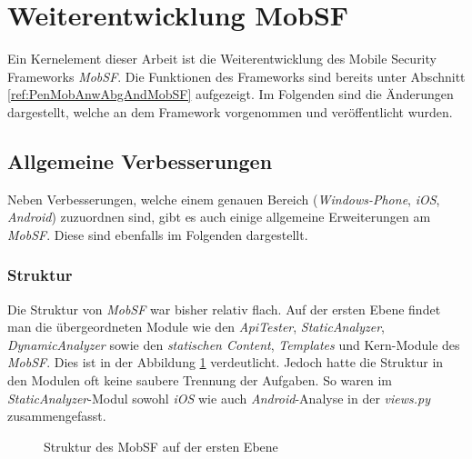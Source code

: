 \section{Weiterentwicklung MobSF}
\label{Weiterentwicklung MobSF}
Ein Kernelement dieser Arbeit ist die Weiterentwicklung des Mobile Security Frameworks \textit{MobSF}. Die Funktionen des Frameworks sind bereits unter Abschnitt \ref{ref:PenMobAnwAbgAndMobSF} aufgezeigt. Im Folgenden sind die Änderungen dargestellt, welche an dem Framework vorgenommen und veröffentlicht wurden.

\subsection{Allgemeine Verbesserungen}
Neben Verbesserungen, welche einem genauen Bereich (\textit{Windows-Phone}, \textit{iOS}, \textit{Android}) zuzuordnen sind, gibt es auch einige allgemeine Erweiterungen am \textit{MobSF}. Diese sind ebenfalls im Folgenden dargestellt.

\subsubsection{Struktur}
Die Struktur von \textit{MobSF} war bisher relativ flach. Auf der ersten Ebene findet man die übergeordneten Module wie den \textit{ApiTester}, \textit{StaticAnalyzer}, \textit{DynamicAnalyzer} sowie den \textit{statischen Content}, \textit{Templates} und Kern-Module des \textit{MobSF}. Dies ist in der Abbildung \ref{fig:MobSFStrukOrig} verdeutlicht. Jedoch hatte die Struktur in den Modulen oft keine saubere Trennung der Aufgaben. So waren im \textit{StaticAnalyzer}-Modul sowohl \textit{iOS} wie auch \textit{Android}-Analyse in der \textit{views.py} zusammengefasst.\\

\begin{figure}[htbp]
\caption{Struktur des MobSF auf der ersten Ebene}
\label{fig:MobSFStrukOrig}
\end{figure}

